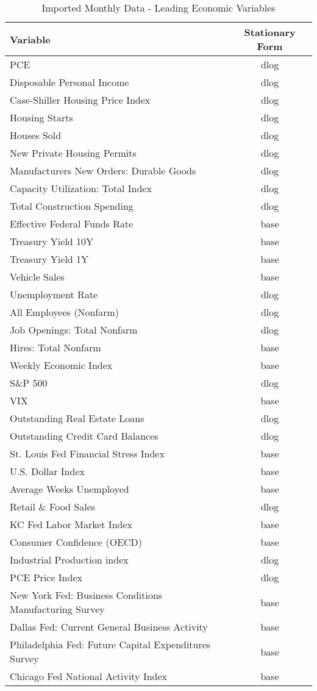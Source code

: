 \documentclass[11pt, letterpaper]{article}\usepackage[]{graphicx}\usepackage[]{color}
\begin{document}
\begin{table}[H]
\centering
\begingroup\scriptsize
\begin{tabular}{lc}
  \hline
Variable & Stationary Form \\ 
  \hline
PCE & dlog \\ 
  Disposable Personal Income & dlog \\ 
  Case-Shiller Housing Price Index & dlog \\ 
  Housing Starts & dlog \\ 
  Houses Sold & dlog \\ 
  New Private Housing Permits & dlog \\ 
  Manufacturers New Orders: Durable Goods & dlog \\ 
  Capacity Utilization: Total Index & dlog \\ 
  Total Construction Spending & dlog \\ 
  Effective Federal Funds Rate & base \\ 
  Treasury Yield 10Y & base \\ 
  Treasury Yield 1Y & base \\ 
  Vehicle Sales & base \\ 
  Unemployment Rate & dlog \\ 
  All Employees (Nonfarm) & dlog \\ 
  Job Openings: Total Nonfarm & dlog \\ 
  Hires: Total Nonfarm & base \\ 
  Weekly Economic Index & base \\ 
  S\&P 500 & dlog \\ 
  VIX & base \\ 
  Outstanding Real Estate Loans & dlog \\ 
  Outstanding Credit Card Balances & dlog \\ 
  St. Louis Fed Financial Stress Index & base \\ 
  U.S. Dollar Index & base \\ 
  Average Weeks Unemployed & base \\ 
  Retail \& Food Sales & dlog \\ 
  KC Fed Labor Market Index & base \\ 
  Consumer Confidence (OECD) & base \\ 
  Industrial Production index & dlog \\ 
  PCE Price Index & dlog \\ 
  New York Fed: Business Conditions Manufacturing Survey & base \\ 
  Dallas Fed: Current General Business Activity & base \\ 
  Philadelphia Fed: Future Capital Expenditures Survey & base \\ 
  Chicago Fed National Activity Index & base \\ 
   \hline
\end{tabular}
\endgroup
\caption{Imported Monthly Data - Leading Economic Variables} 
\end{table}
\end{document}
